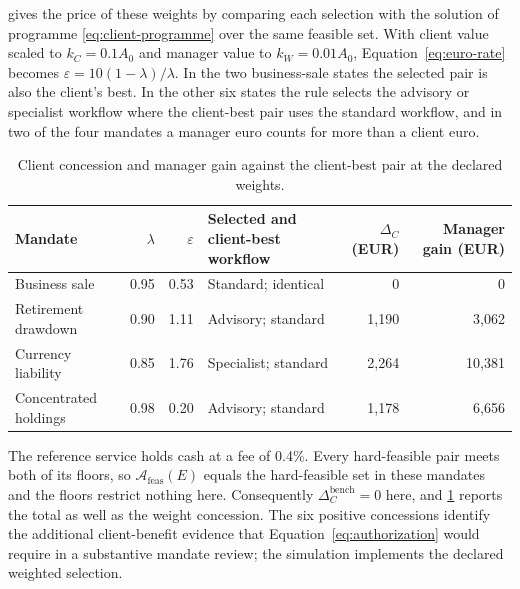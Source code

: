 \documentclass[oneside,10pt,english]{swissi}
\begin{document}
 gives the price of these weights by comparing each selection with the solution of programme \eqref{eq:client-programme} over the same feasible set. With client value scaled to $k_C=0.1A_0$ and manager value to $k_W=0.01A_0$, Equation~\eqref{eq:euro-rate} becomes $\varepsilon=10(1-\lambda)/\lambda$. In the two business-sale states the selected pair is also the client's best. In the other six states the rule selects the advisory or specialist workflow where the client-best pair uses the standard workflow, and in two of the four mandates a manager euro counts for more than a client euro.

\begin{table}[htbp]
\centering
\caption{Client concession and manager gain against the client-best pair at the declared weights.}
\label{tab:concession}
\small
\begin{tabularx}{\textwidth}{@{}>{\raggedright\arraybackslash}Xrr>{\raggedright\arraybackslash}p{}rr@{}}
\toprule
Mandate & $\lambda$ & $\varepsilon$ & Selected and client-best workflow & $\Delta_C$ (EUR) & Manager gain (EUR) \\
\midrule
Business sale & 0.95 & 0.53 & Standard; identical & 0 & 0 \\
Retirement drawdown & 0.90 & 1.11 & Advisory; standard & 1,190 & 3,062 \\
Currency liability & 0.85 & 1.76 & Specialist; standard & 2,264 & 10,381 \\
Concentrated holdings & 0.98 & 0.20 & Advisory; standard & 1,178 & 6,656 \\
\bottomrule
\end{tabularx}
{\raggedright{}}
\end{table}

The reference service holds cash at a fee of 0.4\%. Every hard-feasible pair meets both of its floors, so $\mathcal A_{\mathrm{feas}}(E)$ equals the hard-feasible set in these mandates and the floors restrict nothing here. Consequently $\Delta_C^{\mathrm{bench}}=0$ here, and \cref{tab:concession} reports the total as well as the weight concession. The six positive concessions identify the additional client-benefit evidence that Equation~\eqref{eq:authorization} would require in a substantive mandate review; the simulation implements the declared weighted selection.
\end{document}
